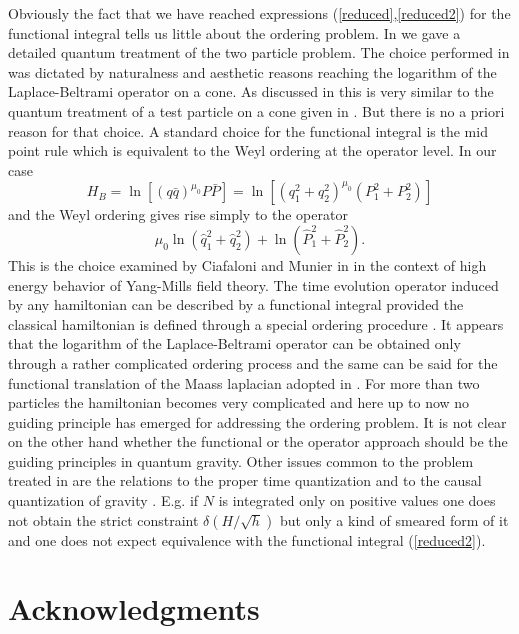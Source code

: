 \documentclass[a4paper,12pt]{article}
\begin{document}
Obviously the fact that we have reached expressions
(\ref{reduced},\ref{reduced2}) for the 
functional integral tells us little about the ordering
problem. In \cite{CMS1} we gave a detailed quantum treatment of the
two particle problem.  
The choice performed in \cite{CMS1} was dictated by naturalness and
aesthetic reasons reaching the logarithm of the Laplace-Beltrami
operator on a cone. As discussed in \cite{CMS1} this is very similar
to the quantum treatment of a test particle on a cone given in
\cite{deserjackiwcmp}. But there is no a priori reason for that choice. A
standard choice for the functional integral is the mid point rule
\cite{lee} which is equivalent to the Weyl ordering at the operator
level. In our case
\begin{equation}
H_B=\ln \left[(q\bar q)^{\mu_0} P\bar P\right] = \ln
\left[(q_1^2+q_2^2)^{\mu_0}(P_1^2+P_2^2)\right]  
\end{equation}
and the Weyl ordering gives rise simply to the operator 
\begin{equation}
\mu_0\ln(\hat{q}_1^2+\hat{q}_2^2)+\ln(\hat{P}_1^2+\hat{P}_2^2).
\end{equation}
This is the choice examined by Ciafaloni and Munier in
\cite{ciafaloni} in the context of high energy behavior of Yang-Mills
field theory. The time evolution operator induced by any hamiltonian
can be described by a functional integral provided the classical
hamiltonian is defined through a special ordering procedure
\cite{weinberg}. It appears that the logarithm of the Laplace-Beltrami
operator can be obtained only through a rather complicated ordering
process and the same can be said for the functional translation of the
Maass laplacian adopted in \cite{hosoya,carlip2}. For more than two
particles the hamiltonian becomes very complicated and here up to now
no guiding principle has emerged for addressing the ordering
problem. It is not clear on the other hand whether the functional or
the operator approach should be the guiding principles in quantum
gravity. Other issues common to the problem treated in \cite{carlip}
are the relations to the proper time quantization
\cite{dasgupta,ambjorn} and to the causal quantization of gravity
\cite{teitelboim}. E.g. if $N$ is integrated only on positive values
one does not obtain the strict constraint $\delta( H/\sqrt{h})$ but
only a kind of smeared form of it and one does not expect equivalence
with the functional integral (\ref{reduced2}).


\section*{Acknowledgments}
\end{document}
